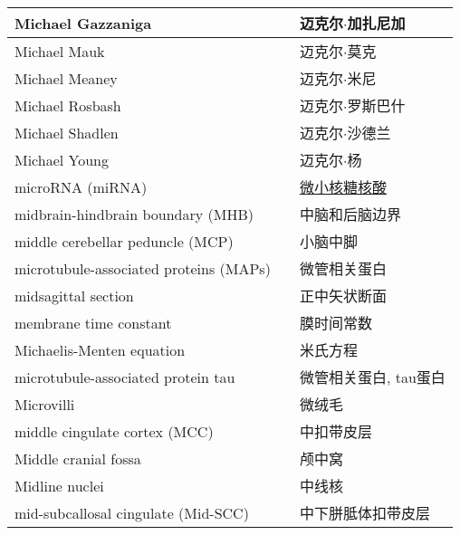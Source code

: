 \begin{longtable}{lll}
	\midrule
	Michael Gazzaniga   && 迈克尔$\cdot$加扎尼加  \\
	
	\midrule
	Michael Mauk   && 迈克尔$\cdot$莫克  \\
	
	\midrule
	Michael Meaney   && 迈克尔$\cdot$米尼  \\
	
	\midrule
	Michael Rosbash   && 迈克尔$\cdot$罗斯巴什  \\
	
	\midrule
	Michael Shadlen   && 迈克尔$\cdot$沙德兰  \\
	
	\midrule
	Michael Young   && 迈克尔$\cdot$杨  \\
	
	\midrule
	microRNA (miRNA)   && \href{https://baike.baidu.com/item/micro\%20RNA/3683223}{微小核糖核酸}  \\
	
	\midrule
	midbrain-hindbrain boundary (MHB) && 中脑和后脑边界  \\
	
	\midrule
	middle cerebellar peduncle (MCP)  && 小脑中脚  \\
	
	\midrule
	microtubule-associated proteins (MAPs)  && 微管相关蛋白  \\
	
	\midrule
	midsagittal section  && 正中矢状断面  \\
	
	\midrule
	membrane time constant   && 膜时间常数  \\
	
	\midrule
	Michaelis-Menten equation   && 米氏方程  \\
	
	\midrule
	microtubule-associated protein tau    && 微管相关蛋白, tau蛋白  \\
	
	\midrule
	Microvilli    && 微绒毛  \\
	
	\midrule
	middle cingulate cortex (MCC)   && 中扣带皮层  \\
	
	\midrule
	Middle cranial fossa   && 颅中窝  \\
	
	\midrule
	Midline nuclei   && 中线核  \\
	
	\midrule
	mid-subcallosal cingulate (Mid-SCC)  && 中下胼胝体扣带皮层  \\
	

\end{longtable}
